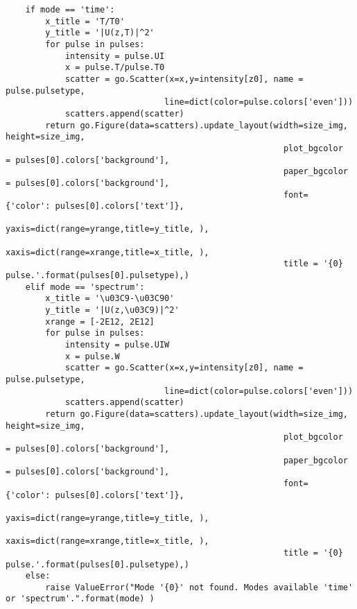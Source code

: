 \begin{verbatim}
    if mode == 'time':
        x_title = 'T/T0'
        y_title = '|U(z,T)|^2'
        for pulse in pulses:
            intensity = pulse.UI
            x = pulse.T/pulse.T0
            scatter = go.Scatter(x=x,y=intensity[z0], name = pulse.pulsetype,
                                line=dict(color=pulse.colors['even']))
            scatters.append(scatter)
        return go.Figure(data=scatters).update_layout(width=size_img, height=size_img,
                                                        plot_bgcolor  = pulses[0].colors['background'],
                                                        paper_bgcolor = pulses[0].colors['background'],
                                                        font= {'color': pulses[0].colors['text']},
                                                        yaxis=dict(range=yrange,title=y_title, ), 
                                                        xaxis=dict(range=xrange,title=x_title, ), 
                                                        title = '{0} pulse.'.format(pulses[0].pulsetype),)
    elif mode == 'spectrum':
        x_title = '\u03C9-\u03C90'
        y_title = '|U(z,\u03C9)|^2'
        xrange = [-2E12, 2E12]
        for pulse in pulses:
            intensity = pulse.UIW
            x = pulse.W
            scatter = go.Scatter(x=x,y=intensity[z0], name = pulse.pulsetype,
                                line=dict(color=pulse.colors['even']))
            scatters.append(scatter)
        return go.Figure(data=scatters).update_layout(width=size_img, height=size_img,
                                                        plot_bgcolor  = pulses[0].colors['background'],
                                                        paper_bgcolor = pulses[0].colors['background'],
                                                        font= {'color': pulses[0].colors['text']},
                                                        yaxis=dict(range=yrange,title=y_title, ), 
                                                        xaxis=dict(range=xrange,title=x_title, ), 
                                                        title = '{0} pulse.'.format(pulses[0].pulsetype),)
    else:
        raise ValueError("Mode '{0}' not found. Modes available 'time' or 'spectrum'.".format(mode) )
\end{verbatim}